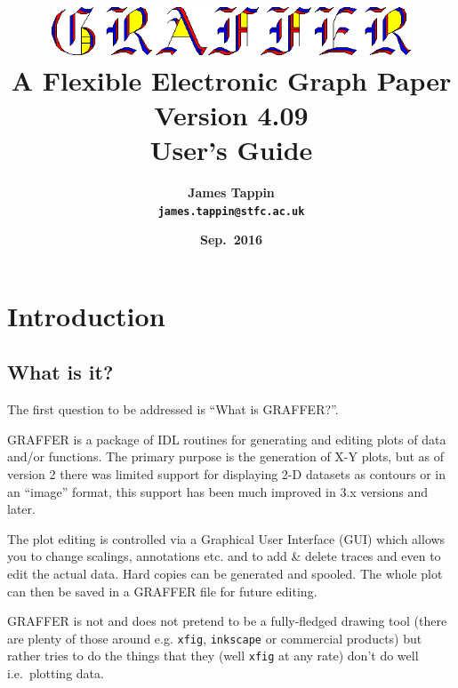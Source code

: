 \documentclass[11pt,twoside,english]{article}
\begin{document}
\title{\includegraphics[width=0.80\textwidth]{logo} \\
  A Flexible Electronic Graph Paper\\
  Version 4.09\\
  User's Guide}

\author{\textsf{\textbf{\Large James Tappin}}\\
  \texttt{\textbf{\Large james.tappin@stfc.ac.uk}}}

\date{\textsf{\textbf{\large Sep.\ 2016}}}

\maketitle

\begin{multicols}{2}
  \tableofcontents{}
\end{multicols}

\section{Introduction}


\subsection{What is it?}

The first question to be addressed is {}``What is GRAFFER?''.

GRAFFER is a package of IDL routines for generating and editing plots
of data and/or functions. The primary purpose is the generation of X-Y
plots, but as of version 2 there was limited support for displaying 2-D
datasets as contours or in an {}``image'' format, this support has been
much improved in 3.x versions and later.

The plot editing is controlled via a Graphical User Interface (GUI)
which allows you to change scalings, annotations etc. and to add \&
delete traces and even to edit the actual data. Hard copies can be
generated and spooled. The whole plot can then be saved in a GRAFFER
file for future editing.

GRAFFER is not and does not pretend to be a fully-fledged drawing tool
(there are plenty of those around e.g. \texttt{xfig},
\texttt{inkscape} or commercial products) but rather tries to do the
things that they (well \texttt{xfig} at any rate) don't do well i.e.\
plotting data.
\end{document}
